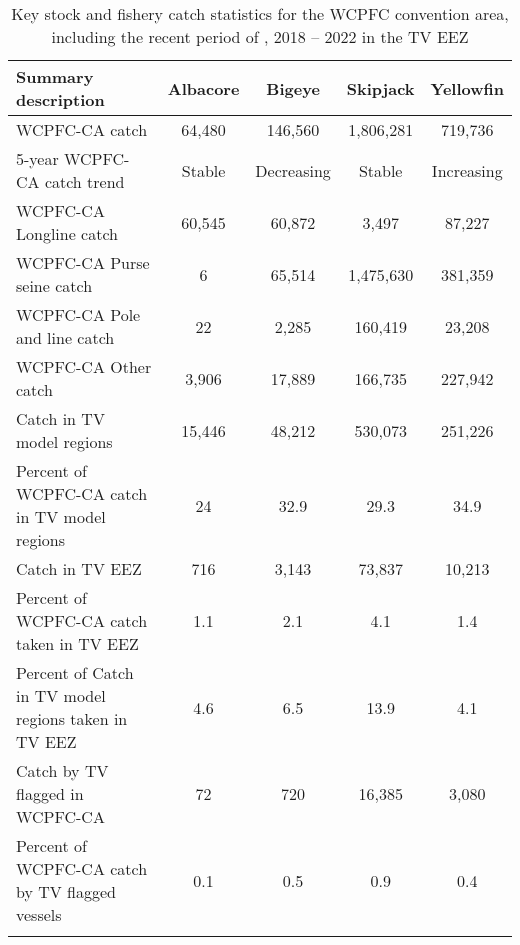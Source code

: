 \begin{longtable}{lcccc}
\caption{Key stock and fishery catch statistics for the WCPFC convention area, including the recent period of , 2018 -- 2022 in the TV EEZ} \\ 
  \hline
Summary description & Albacore & Bigeye & Skipjack & Yellowfin \\ 
  \hline
WCPFC-CA catch & 64,480 & 146,560 & 1,806,281 & 719,736 \\ 
  5-year WCPFC-CA catch trend & Stable & Decreasing & Stable & Increasing \\ 
  WCPFC-CA Longline catch & 60,545 & 60,872 & 3,497 & 87,227 \\ 
  WCPFC-CA Purse seine catch & 6 & 65,514 & 1,475,630 & 381,359 \\ 
  WCPFC-CA Pole and line catch & 22 & 2,285 & 160,419 & 23,208 \\ 
  WCPFC-CA Other catch & 3,906 & 17,889 & 166,735 & 227,942 \\ 
  Catch in TV model regions & 15,446 & 48,212 & 530,073 & 251,226 \\ 
  Percent of WCPFC-CA catch in TV model regions & 24 & 32.9 & 29.3 & 34.9 \\ 
   \hline
Catch in TV EEZ & 716 & 3,143 & 73,837 & 10,213 \\ 
  Percent of WCPFC-CA catch taken in TV EEZ & 1.1 & 2.1 & 4.1 & 1.4 \\ 
  Percent of Catch in TV model regions taken in TV EEZ & 4.6 & 6.5 & 13.9 & 4.1 \\ 
  Catch by TV flagged in WCPFC-CA & 72 & 720 & 16,385 & 3,080 \\ 
  Percent of WCPFC-CA catch by TV flagged vessels & 0.1 & 0.5 & 0.9 & 0.4 \\ 
  \hline
\label{cat_sum_tab}
\end{longtable}
